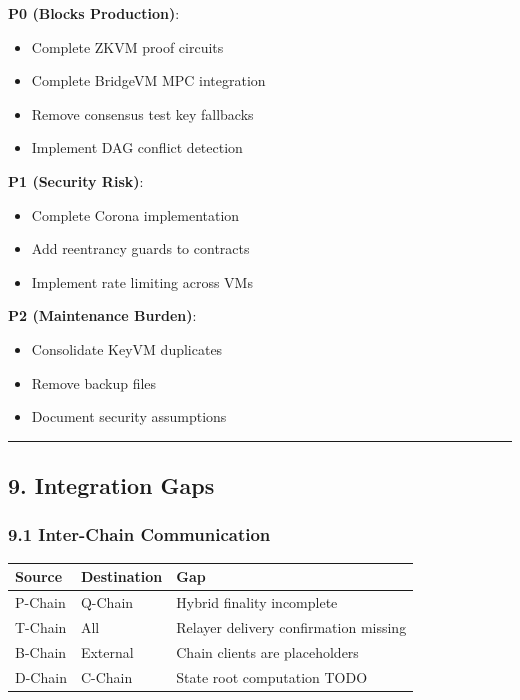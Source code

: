 \documentclass[
]{article}
\newcounter{none} %
\providecommand{\tightlist}{%
  \setlength{\itemsep}{0pt}\setlength{\parskip}{0pt}}
\begin{document}
\textbf{P0 (Blocks Production)}:

\begin{itemize}
\tightlist
\item
  Complete ZKVM proof circuits
\item
  Complete BridgeVM MPC integration
\item
  Remove consensus test key fallbacks
\item
  Implement DAG conflict detection
\end{itemize}

\textbf{P1 (Security Risk)}:

\begin{itemize}
\tightlist
\item
  Complete Corona implementation
\item
  Add reentrancy guards to contracts
\item
  Implement rate limiting across VMs
\end{itemize}

\textbf{P2 (Maintenance Burden)}:

\begin{itemize}
\tightlist
\item
  Consolidate KeyVM duplicates
\item
  Remove backup files
\item
  Document security assumptions
\end{itemize}

\begin{center}\rule{0.5\linewidth}{0.5pt}\end{center}

\subsection{9. Integration Gaps}\label{9-integration-gaps}

\subsubsection{9.1 Inter-Chain
Communication}\label{91-inter-chain-communication}

{\def\LTcaptype{none} %
\begin{longtable}[]{@{}lll@{}}
\toprule\noalign{}
Source & Destination & Gap \\
\midrule\noalign{}
\endhead
\bottomrule\noalign{}
\endlastfoot
P-Chain & Q-Chain & Hybrid finality incomplete \\
T-Chain & All & Relayer delivery confirmation missing \\
B-Chain & External & Chain clients are placeholders \\
D-Chain & C-Chain & State root computation TODO \\
\end{longtable}
}
\end{document}
